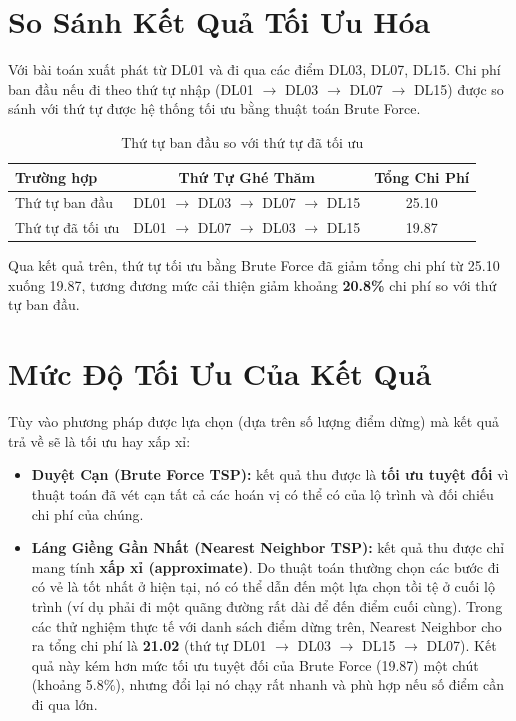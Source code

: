 \section{So Sánh Kết Quả Tối Ưu Hóa}

Với bài toán xuất phát từ DL01 và đi qua các điểm DL03, DL07, DL15. Chi phí ban đầu nếu đi theo thứ tự nhập (DL01 $\rightarrow$ DL03 $\rightarrow$ DL07 $\rightarrow$ DL15) được so sánh với thứ tự được hệ thống tối ưu bằng thuật toán Brute Force.

\begin{table}[h!]
\centering
\caption{Thứ tự ban đầu so với thứ tự đã tối ưu}
\label{tab:multilocation_opt}
\begin{tabular}{lcc}
\toprule
Trường hợp & Thứ Tự Ghé Thăm & Tổng Chi Phí \\
\midrule
Thứ tự ban đầu & DL01 $\rightarrow$ DL03 $\rightarrow$ DL07 $\rightarrow$ DL15 & 25.10 \\
Thứ tự đã tối ưu & DL01 $\rightarrow$ DL07 $\rightarrow$ DL03 $\rightarrow$ DL15 & 19.87 \\
\bottomrule
\end{tabular}
\end{table}

Qua kết quả trên, thứ tự tối ưu bằng Brute Force đã giảm tổng chi phí từ 25.10 xuống 19.87, tương đương mức cải thiện giảm khoảng \textbf{20.8\%} chi phí so với thứ tự ban đầu.

\section{Mức Độ Tối Ưu Của Kết Quả}

Tùy vào phương pháp được lựa chọn (dựa trên số lượng điểm dừng) mà kết quả trả về sẽ là tối ưu hay xấp xỉ:

\begin{itemize}[itemsep=2pt]
  \item \textbf{Duyệt Cạn (Brute Force TSP):} kết quả thu được là \textbf{tối ưu tuyệt đối} vì thuật toán đã vét cạn tất cả các hoán vị có thể có của lộ trình và đối chiếu chi phí của chúng.
  \item \textbf{Láng Giềng Gần Nhất (Nearest Neighbor TSP):} kết quả thu được chỉ mang tính \textbf{xấp xỉ (approximate)}. Do thuật toán thường chọn các bước đi có vẻ là tốt nhất ở hiện tại, nó có thể dẫn đến một lựa chọn tồi tệ ở cuối lộ trình (ví dụ phải đi một quãng đường rất dài để đến điểm cuối cùng). Trong các thử nghiệm thực tế với danh sách điểm dừng trên, Nearest Neighbor cho ra tổng chi phí là \textbf{21.02} (thứ tự DL01 $\rightarrow$ DL03 $\rightarrow$ DL15 $\rightarrow$ DL07). Kết quả này kém hơn mức tối ưu tuyệt đối của Brute Force (19.87) một chút (khoảng 5.8\%), nhưng đổi lại nó chạy rất nhanh và phù hợp nếu số điểm cần đi qua lớn.
\end{itemize}
